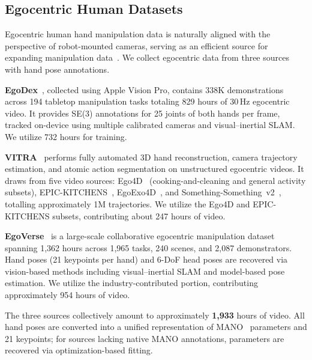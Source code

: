 \subsection{Egocentric Human Datasets}

Egocentric human hand manipulation data is naturally aligned with the perspective of robot-mounted cameras, serving as an efficient source for expanding manipulation data~\citep{kareer2025egomimic,qiu2025humanoid,egoscale,beingh0,beingh05,easymimic}.
We collect egocentric data from three sources with hand pose annotations.

\textbf{EgoDex}~\citep{egodex}, collected using Apple Vision Pro, contains 338K demonstrations across 194 tabletop manipulation tasks totaling 829 hours of 30\,Hz egocentric video.
It provides SE(3) annotations for 25 joints of both hands per frame, tracked on-device using multiple calibrated cameras and visual--inertial SLAM.
We utilize 732 hours for training.

\textbf{VITRA}~\citep{vitra} performs fully automated 3D hand reconstruction, camera trajectory estimation, and atomic action segmentation on unstructured egocentric videos.
It draws from five video sources: Ego4D~\citep{grauman2022ego4d} (cooking-and-cleaning and general activity subsets), EPIC-KITCHENS~\citep{damen2018epic}, EgoExo4D~\citep{egoexo4d}, and Something-Something~v2~\citep{ssv2}, totalling approximately 1M trajectories.
We utilize the Ego4D and EPIC-KITCHENS subsets, contributing about 247 hours of video.

\textbf{EgoVerse}~\citep{egoverse} is a large-scale collaborative egocentric manipulation dataset spanning 1,362 hours across 1,965 tasks, 240 scenes, and 2,087 demonstrators.
Hand poses (21 keypoints per hand) and 6-DoF head poses are recovered via vision-based methods including visual--inertial SLAM and model-based pose estimation.
We utilize the industry-contributed portion, contributing approximately 954 hours of video.

The three sources collectively amount to approximately \textbf{1,933} hours of video.
All hand poses are converted into a unified representation of MANO~\citep{mano} parameters and 21 keypoints; for sources lacking native MANO annotations, parameters are recovered via optimization-based fitting.


